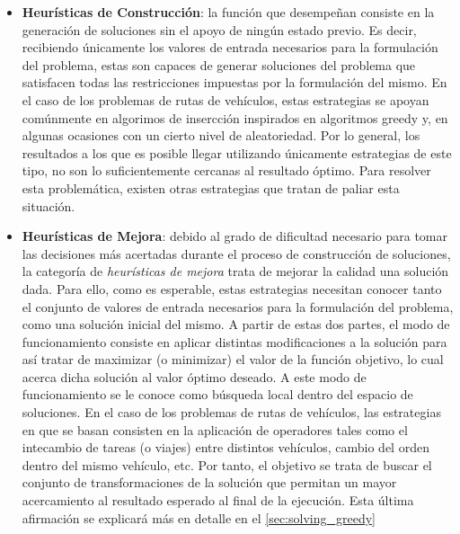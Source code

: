 \documentclass{subfiles}
\begin{document}
      \begin{itemize}
          
          \item \textbf{Heurísticas de Construcción}: la función que desempeñan consiste en la generación de soluciones sin el apoyo de ningún estado previo. Es decir, recibiendo únicamente los valores de entrada necesarios para la formulación del problema, estas son capaces de generar soluciones del problema que satisfacen todas las restricciones impuestas por la formulación del mismo. En el caso de los problemas de rutas de vehículos, estas estrategias se apoyan comúnmente en algorimos de insercción inspirados en algoritmos greedy y, en algunas ocasiones con un cierto nivel de aleatoriedad. Por lo general, los resultados a los que es posible llegar utilizando únicamente estrategias de este tipo, no son lo suficientemente cercanas al resultado óptimo. Para resolver esta problemática, existen otras estrategias que tratan de paliar esta situación.

          \item \textbf{Heurísticas de Mejora}: debido al grado de dificultad necesario para tomar las decisiones más acertadas durante el proceso de construcción de soluciones, la categoría de \emph{heurísticas de mejora} trata de mejorar la calidad una solución dada. Para ello, como es esperable, estas estrategias necesitan conocer tanto el conjunto de valores de entrada necesarios para la formulación del problema, como una solución inicial del mismo. A partir de estas dos partes, el modo de funcionamiento consiste en aplicar distintas modificaciones a la solución para así tratar de maximizar (o minimizar) el valor de la función objetivo, lo cual acerca dicha solución al valor óptimo deseado. A este modo de funcionamiento se le conoce como búsqueda local dentro del espacio de soluciones. En el caso de los problemas de rutas de vehículos, las estrategias en que se basan consisten en la aplicación de operadores tales como el intecambio de tareas (o viajes) entre distintos vehículos, cambio del orden dentro del mismo vehículo, etc. Por tanto, el objetivo se trata de buscar el conjunto de transformaciones de la solución que permitan un mayor acercamiento al resultado esperado al final de la ejecución. Esta última afirmación se explicará más en detalle en el \cref{sec:solving_greedy}
      
      \end{itemize}
\end{document}
